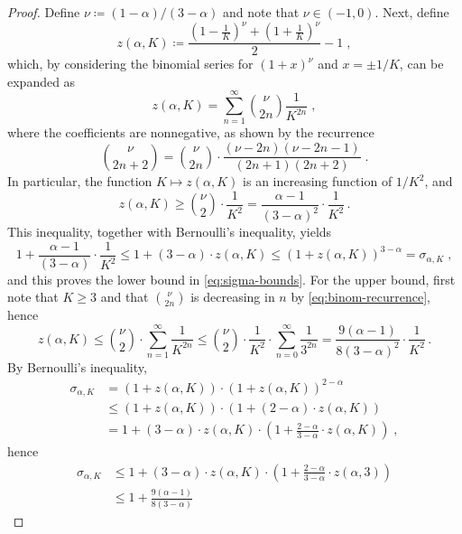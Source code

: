 \documentclass[11pt,oneside,a4paper]{article}
\newcommand{\lrb}[1]{\left(#1\right)}
\theoremstyle{plain}
\theoremstyle{definition}
\theoremstyle{remark}
\begin{document}
\begin{proof}
Define $\nu \coloneq (1 - \alpha)/(3- \alpha)$ and note that $\nu \in (-1,0)$.
Next, define
\[
    z(\alpha, K)
\coloneq
    \frac{ (1-\frac{1}{K})^{\nu} + (1+\frac{1}{K})^{\nu} }{2} - 1\;,
\]
which, by considering the binomial series for $(1 + x)^\nu$ and $x = \pm 1/K$, can be expanded as
\begin{equation}\label{eq:z-expasion}
    z(\alpha, K)
=
    \sum_{n=1}^{\infty} \binom{\nu}{2n} \frac{1}{K^{2n}}\;,    
\end{equation}
where the coefficients are nonnegative, as shown by the recurrence 
\begin{equation}\label{eq:binom-recurrence}    
    \binom{\nu}{2n+2} 
= 
    \binom{\nu}{2n}
    \cdot
    \frac{(\nu- 2n)(\nu - 2n - 1)}{ (2n + 1)(2n + 2) }\;.
\end{equation}
In particular, the function $K \mapsto z(\alpha, K)$ is an increasing function of $1/K^2$, and 
\[
    z(\alpha, K)
\ge
    \binom{\nu}{2}\cdot  \frac{1}{K^{2}}
=
    \frac{\alpha - 1}{(3- \alpha)^2} \cdot \frac{1}{K^2}\,.
\]
This inequality, together with Bernoulli's inequality, yields
\[
    1 +  \frac{\alpha - 1}{(3- \alpha)} \cdot \frac{1}{K^2}
\le
    1 + (3-\alpha)\cdot z(\alpha, K)
\le
    (1 + z(\alpha, K))^{3-\alpha}
=   
    \sigma_{\alpha, K}\;,
\]
and this proves the lower bound in \eqref{eq:sigma-bounds}.
For the upper bound, first note that $K \ge 3$ and that
$\binom{\nu}{2n}$ is decreasing in $n$ by \eqref{eq:binom-recurrence}, hence
\[
    z(\alpha, K)
\le
    \binom{\nu}{2}\cdot 
    \sum_{n=1}^{\infty}  \frac{1}{K^{2n}}
\le
    \binom{\nu}{2}\cdot 
    \frac{1}{K^2}\cdot 
    \sum_{n=0}^{\infty}  \frac{1}{3^{2n}}
=
    \frac{9(\alpha - 1)}{8(3- \alpha)^2}
    \cdot \frac{1}{K^2}\,.
\]
By Bernoulli's inequality,
\begin{align*}
    \sigma_{\alpha, K}
&=
    \lrb{1 + z(\alpha, K)}
    \cdot (1 + z(\alpha, K))^{2-\alpha}
\\
&\le
    (1 + z(\alpha, K))\cdot (1 + (2- \alpha)\cdot z(\alpha, K))
\\
&=
    1 + (3 - \alpha)\cdot  z(\alpha, K) \cdot 
        \lrb{1 +  \frac{2 - \alpha}{3 - \alpha} \cdot z(\alpha, K) }
\;,
\end{align*}
hence
\begin{align*}
    \sigma_{\alpha, K}
&\le
    1 + (3 - \alpha) \cdot z(\alpha, K) \cdot 
        \lrb{1 +  \frac{2 - \alpha}{3 - \alpha} \cdot z(\alpha, 3)}
\\
&\le
    1 +  \frac{9(\alpha - 1)}{8(3- \alpha)}

\end{align*}
\end{proof}
\end{document}
